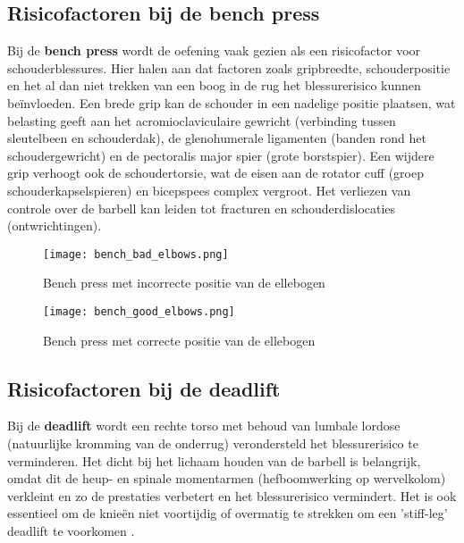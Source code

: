 \subsection{Risicofactoren bij de bench press}
\label{subsec:risicofactoren-bench-press}
Bij de \textbf{bench press} wordt de oefening vaak gezien als een risicofactor voor schouderblessures. 
Hier halen \textcite{BengtssonEtAl2018} aan dat factoren zoals gripbreedte, schouderpositie en het al dan niet trekken van een boog in de rug het blessurerisico kunnen beïnvloeden. 
Een brede grip kan de schouder in een nadelige positie plaatsen, wat belasting geeft aan het acromioclaviculaire gewricht (verbinding tussen sleutelbeen en schouderdak), de glenohumerale ligamenten (banden rond het schoudergewricht) en de pectoralis major spier (grote borstspier). 
Een wijdere grip verhoogt ook de schoudertorsie, wat de eisen aan de rotator cuff (groep schouderkapselspieren) en bicepspees complex vergroot. 
Het verliezen van controle over de barbell kan leiden tot fracturen en schouderdislocaties (ontwrichtingen).

\begin{figure}[h]
  \centering
  \begin{minipage}{0.45\textwidth}
      \centering
      \texttt{[image: bench\_bad\_elbows.png]}
      \caption[Bench press met incorrecte positie van de ellebogen]{\label{fig:bench_incorrect}Bench press met incorrecte positie van de ellebogen \autocite{Ronai2018}}
  \end{minipage}
  \hfill %
  \begin{minipage}{0.45\textwidth}
      \centering
      \texttt{[image: bench\_good\_elbows.png]}
      \caption[Bench press met correcte positie van de ellebogen]{\label{fig:bench_correct}Bench press met correcte positie van de ellebogen \autocite{Ronai2018}}
  \end{minipage}
\end{figure}    

\subsection{Risicofactoren bij de deadlift}
\label{subsec:risicofactoren-deadlift}
Bij de \textbf{deadlift} wordt een rechte torso met behoud van lumbale lordose (natuurlijke kromming van de onderrug) verondersteld het blessurerisico te verminderen. 
Het dicht bij het lichaam houden van de barbell is belangrijk, omdat dit de heup- en spinale momentarmen (hefboomwerking op wervelkolom) verkleint en zo de prestaties verbetert en het blessurerisico vermindert. 
Het is ook essentieel om de knieën niet voortijdig of overmatig te strekken om een 'stiff-leg' deadlift te voorkomen \autocite{BengtssonEtAl2018}.

